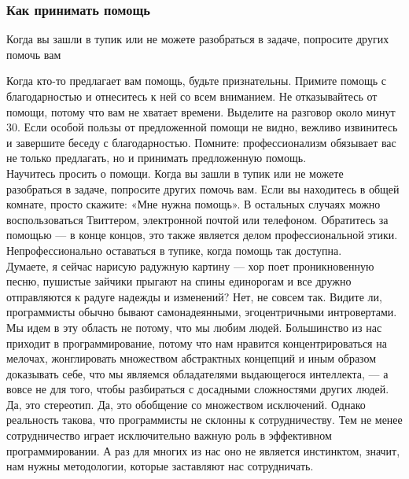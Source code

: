 \documentclass{../industrial-development}
\begin{document}
\begin{frame} \frametitle{Как принимать помощь}
\begin{block}{}
	Когда вы зашли в тупик или не можете разобраться в задаче, попросите других помочь вам
\end{block}
\end{frame}
\lecturenotes
Когда кто-то предлагает вам помощь, будьте признательны. Примите помощь с благодарностью и отнеситесь к ней со всем вниманием. Не отказывайтесь от помощи, потому что вам не хватает времени. Выделите на разговор около минут 30. Если особой пользы от предложенной помощи не видно, вежливо извинитесь и завершите беседу с благодарностью. Помните: профессионализм обязывает вас не только предлагать, но и принимать предложенную помощь.\\
Научитесь просить о помощи. Когда вы зашли в тупик или не можете разобраться в задаче, попросите других помочь вам. Если вы находитесь в общей комнате, просто скажите: «Мне нужна помощь». В остальных случаях можно воспользоваться Твиттером, электронной почтой или телефоном. Обратитесь за помощью — в конце концов, это также является делом профессиональной этики. Непрофессионально оставаться в тупике, когда помощь так доступна.\\
Думаете, я сейчас нарисую радужную картину — хор поет проникновенную песню, пушистые зайчики прыгают на спины единорогам и все дружно отправляются к радуге надежды и изменений? Нет, не совсем так. Видите ли, программисты обычно бывают самонадеянными, эгоцентричными интровертами. Мы идем в эту область не потому, что мы любим людей. Большинство из нас приходит в программирование, потому что нам нравится концентрироваться на мелочах, жонглировать множеством абстрактных концепций и иным образом доказывать себе, что мы являемся обладателями выдающегося интеллекта, — а вовсе не для того, чтобы разбираться с досадными сложностями других людей.\\
Да, это стереотип. Да, это обобщение со множеством исключений. Однако реальность такова, что программисты не склонны к сотрудничеству. Тем не менее сотрудничество играет исключительно важную
роль в эффективном программировании. А раз для многих из нас оно не является инстинктом, значит, нам нужны методологии, которые заставляют нас сотрудничать.
\end{document}

